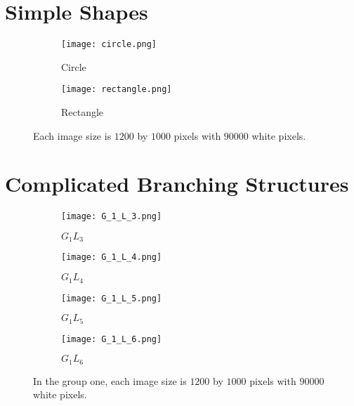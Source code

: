 

\section{Simple Shapes}


   \begin{figure}[h!]

     \centering
        
        \begin{subfigure}[b]{0.45\textwidth}
          \texttt{[image: circle.png]}
          \caption{Circle}
          \label{fig:circle}
        \end{subfigure}
        \hfill
        \begin{subfigure}[b]{0.45\textwidth}
          \texttt{[image: rectangle.png]}
          \caption{Rectangle}
          \label{fig:rectangle}
        \end{subfigure}

        \caption{Each image size is $1200$ by $1000$ pixels with
          $90000$ white pixels.}
        \label{fig:simple_imgs}

   \end{figure}
   



\section{Complicated Branching Structures}

   
    \begin{figure}

     \centering
        
        \begin{subfigure}[b]{0.45\textwidth}
          \texttt{[image: G\_1\_L\_3.png]}
          \caption{$G_1L_3$}
          \label{fig:G1L3}
        \end{subfigure}
        \hfill
        \begin{subfigure}[b]{0.45\textwidth}
          \texttt{[image: G\_1\_L\_4.png]}
          \caption{$G_1L_4$}
          \label{fig:G1L4}
        \end{subfigure}

        \begin{subfigure}[b]{0.45\textwidth}
          \texttt{[image: G\_1\_L\_5.png]}
          \caption{$G_1L_5$}
          \label{fig:G1L5}
        \end{subfigure}
        \hfill
        \begin{subfigure}[b]{0.45\textwidth}
          \texttt{[image: G\_1\_L\_6.png]}
          \caption{$G_1L_6$}
          \label{fig:G1L6}
        \end{subfigure}

        \caption{In the group one, each image size is $1200$ by $1000$ pixels with
          $90000$ white pixels.}
        \label{fig:G1_imgs}

    \end{figure}




